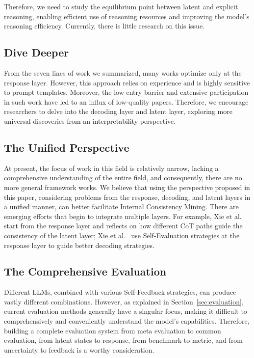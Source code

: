 \documentclass[lettersize,journal]{IEEEtran}
\begin{document}
Therefore, we need to study the equilibrium point between latent and explicit reasoning, enabling efficient use of reasoning resources and improving the model's reasoning efficiency. Currently, there is little research on this issue.


\subsection{Dive Deeper}


\noindent From the seven lines of work we summarized, many works optimize only at the response layer. However, this approach relies on experience and is highly sensitive to prompt templates. Moreover, the low entry barrier and extensive participation in such work have led to an influx of low-quality papers. Therefore, we encourage researchers to delve into the decoding layer and latent layer, exploring more universal discoveries from an interpretability perspective.


\subsection{The Unified Perspective}


\noindent At present, the focus of work in this field is relatively narrow, lacking a comprehensive understanding of the entire field, and consequently, there are no more general framework works. We believe that using the perspective proposed in this paper, considering problems from the response, decoding, and latent layers in a unified manner, can better facilitate Internal Consistency Mining. There are emerging efforts that begin to integrate multiple layers. For example, Xie et al.~\cite{CalibIC_24_arXiv_SJTU} start from the response layer and reflects on how different CoT paths guide the consistency of the latent layer; Xie et al.~\cite{SelfEvaluation_23_NeuIPS_NUS} use Self-Evaluation strategies at the response layer to guide better decoding strategies.


\subsection{The Comprehensive Evaluation}


\noindent Different LLMs, combined with various Self-Feedback strategies, can produce vastly different combinations. However, as explained in Section~\ref{sec:evaluation}, current evaluation methods generally have a singular focus, making it difficult to comprehensively and conveniently understand the model's capabilities. Therefore, building a complete evaluation system from meta evaluation to common evaluation, from latent states to response, from benchmark to metric, and from uncertainty to feedback is a worthy consideration.
\end{document}
